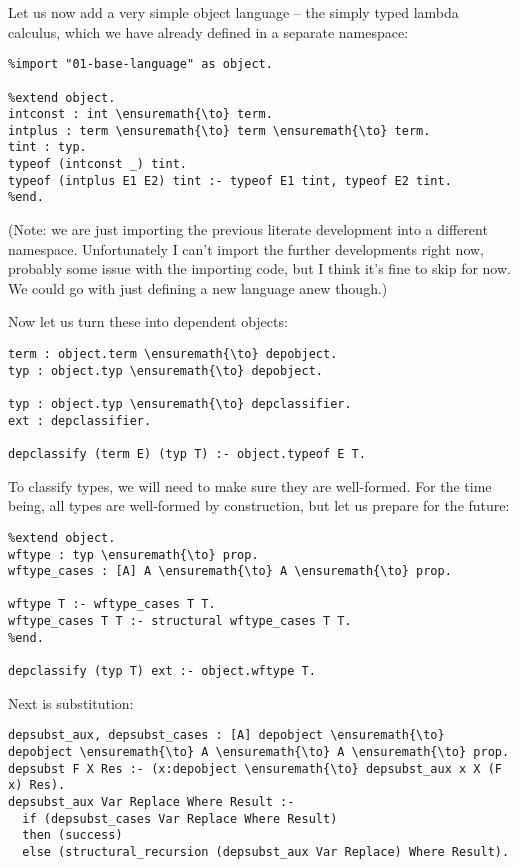 Let us now add a very simple object language -- the simply typed lambda
calculus, which we have already defined in a separate namespace:

\begin{verbatim}
%import "01-base-language" as object.

%extend object.
intconst : int \ensuremath{\to} term.
intplus : term \ensuremath{\to} term \ensuremath{\to} term.
tint : typ.
typeof (intconst _) tint.
typeof (intplus E1 E2) tint :- typeof E1 tint, typeof E2 tint.
%end.
\end{verbatim}

(Note: we are just importing the previous literate development into a
different namespace. Unfortunately I can't import the further
developments right now, probably some issue with the importing code, but
I think it's fine to skip for now. We could go with just defining a new
language anew though.)

Now let us turn these into dependent objects:

\begin{verbatim}
term : object.term \ensuremath{\to} depobject.
typ : object.typ \ensuremath{\to} depobject.

typ : object.typ \ensuremath{\to} depclassifier.
ext : depclassifier.

depclassify (term E) (typ T) :- object.typeof E T.
\end{verbatim}

To classify types, we will need to make sure they are well-formed. For
the time being, all types are well-formed by construction, but let us
prepare for the future:

\begin{verbatim}
%extend object.
wftype : typ \ensuremath{\to} prop.
wftype_cases : [A] A \ensuremath{\to} A \ensuremath{\to} prop.

wftype T :- wftype_cases T T.
wftype_cases T T :- structural wftype_cases T T.
%end.

depclassify (typ T) ext :- object.wftype T.
\end{verbatim}

Next is substitution:

\begin{verbatim}
depsubst_aux, depsubst_cases : [A] depobject \ensuremath{\to} depobject \ensuremath{\to} A \ensuremath{\to} A \ensuremath{\to} prop.
depsubst F X Res :- (x:depobject \ensuremath{\to} depsubst_aux x X (F x) Res).
depsubst_aux Var Replace Where Result :-
  if (depsubst_cases Var Replace Where Result)
  then (success)
  else (structural_recursion (depsubst_aux Var Replace) Where Result).
\end{verbatim}

